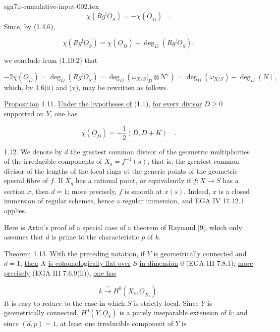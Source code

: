 \begin{filecontents*}{sga7ii-cumulative-input-002.tex}
\begin{equation*}
\chi(Rg^{!}\underline{O}_S)=-\chi(\underline{O}_D) \quad .
\end{equation*}
Since, by (1.4.6),

\begin{equation*}
\chi(Rg^{!}\underline{O}_S)
=\chi(\underline{O}_D)+\deg_D(Rg^{!}\underline{O}_S),
\end{equation*}


we conclude from (1.10.2) that

\begin{equation*}
-2\chi(\underline{O}_D)
=\deg_D(Rg^{!}\underline{O}_S)
=\deg_D(\omega_{X/S}|_D\otimes N^{\vee})
=\deg_D(\omega_{X/S})-\deg_D(N),
\end{equation*}
which, by 1.6(ii) and (v), may be rewritten as follows.

\underline{Proposition} 1.11. \underline{Under the hypotheses of} (1.1),
\underline{for every divisor} $D\geq0$ \underline{supported on} $Y$,
\underline{one has}

\begin{equation*}
\chi(\underline{O}_D)=-\frac12(D,D+K) \quad .
\end{equation*}

1.12. We denote by $d$ the greatest common divisor of the geometric
multiplicities of the irreducible components of $X_s=f^{-1}(s)$; that is, the
greatest common divisor of the lengths of the local rings at the generic points
of the geometric special fibre of $f$.  If $X_\eta$ has a rational point, or
equivalently if $f:X\longrightarrow S$ has a section $x$, then $d=1$; more
precisely, $f$ is smooth at $x(s)$.  Indeed, $x$ is a closed immersion of regular
schemes, hence a regular immersion, and EGA IV 17.12.1 applies.

Here is Artin's proof of a special case of a theorem of Raynaud [9], which only
assumes that $d$ is prime to the characteristic $p$ of $k$.

\underline{Theorem} 1.13. \underline{With the preceding notation, if} $Y$
\underline{is geometrically connected and} $d=1$, \underline{then} $X$
\underline{is cohomologically flat over} $S$ \underline{in dimension} $0$
(EGA III 7.8.1); \underline{more precisely} (EGA III 7.6.9(ii)),
\underline{one has}

\begin{equation*}
k\xrightarrow{\;\sim\;}H^0(X_s,\underline{O}_{X_s}).
\end{equation*}
It is easy to reduce to the case in which $S$ is strictly local.  Since $Y$ is
geometrically connected, $H^0(Y,\underline{O}_Y)$ is a purely inseparable
extension of $k$; and since $(d,p)=1$, at least one irreducible component of $Y$
is


\end{filecontents*}
